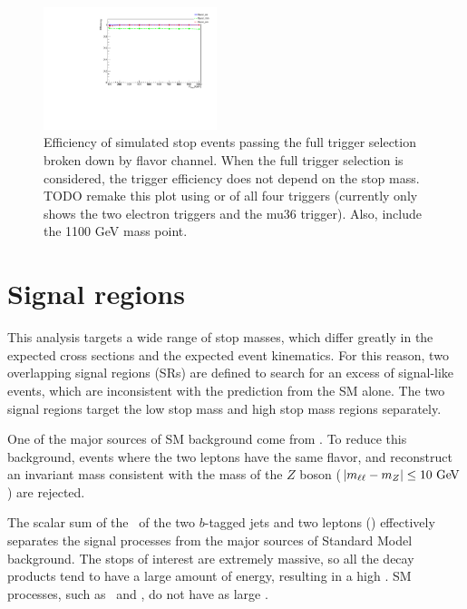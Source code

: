 \begin{figure}[ht]
  \centering
  \includegraphics[width=0.45\textwidth]
    {figs/trigger/EF_e24vhi_medium1_OR_EF_e60_medium1_OR_EF_mu36_tight.pdf}
  \caption{Efficiency of simulated stop events passing the full trigger
    selection broken down by flavor channel.
    When the full trigger selection is considered, the trigger efficiency does
    not depend on the stop mass.
    {\color{red} TODO remake this plot using or of all four triggers (currently
      only shows the two electron triggers and the mu36 trigger). Also, include
      the 1100 GeV mass point.
    }
  }
  \label{fig:full_trigger_efficiency}
\end{figure}

\section{Signal regions}
\label{sec:signal_regions}

This analysis targets a wide range of stop masses, which differ greatly in the
expected cross sections and the expected event kinematics.
For this reason, two overlapping signal regions (SRs) are defined to search for
an excess of signal-like events, which are inconsistent with the prediction from
the SM alone.
The two signal regions target the low stop mass and high stop mass regions
separately.

One of the major sources of SM background come from \ZGAMMAJETS.
To reduce this background, events where the two leptons have the same
flavor, and reconstruct an invariant mass consistent with the mass of the $Z$
boson ($|m_{\ell\ell} - m_{Z}| \leq 10 \GeV$) are rejected.

The scalar sum of the \pt\ of the two $b$-tagged jets and two leptons (\HT) 
effectively separates the signal processes from the major sources of
Standard Model background.
The stops of interest are extremely massive, so all the decay products tend to
have a large amount of energy, resulting in a high \HT.
SM processes, such as \TTBAR\ and \ZGAMMAJETS, do not have as large \HT.

